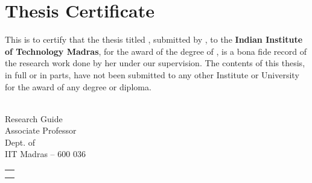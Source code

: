 \def\certheadingstr{Thesis Certificate}%
\chapter*{\certheadingstr}

\vspace*{0.5in}  

\noindent 
This is to certify that the thesis titled {\bf
  \mythesistitleNOTSYNPOSIS}, submitted by {\bf \myname}, to the {\bf
  Indian Institute of Technology Madras}, for the award of the degree
of {\bf \mydegree}, is a bona fide record of the research work done by
her under our supervision.  The contents of this thesis, in full or in
parts, have not been submitted to any other Institute or University
for the award of any degree or diploma.

\vspace*{1.5in}

\begin{singlespacing}
  \hspace*{-0.25in}
  \parbox{3in}{
     \\
    \small
    \noindent Research Guide\\
    \noindent Associate Professor\\
    \noindent Dept. of \mydept\\
    \noindent IIT Madras -- 600 036 } \hfill
  \parbox{1.25in}{               %
    \small
    \vspace*{0.75in}
    \begin{tabular}[h]{r}
    \noindent {Chennai}\\         
    \noindent {\mythesissubmissiondate} 
    \end{tabular}
  }
\end{singlespacing}

